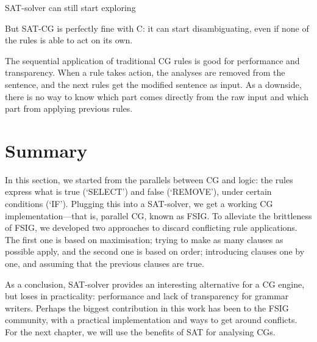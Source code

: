 SAT-solver can still start exploring

But SAT-CG is perfectly fine with C: it can start disambiguating, even if none of the rules is able to act on its own. 




The sequential application of traditional CG rules is good for
performance and transparency. When a rule takes action, the analyses
are removed from the sentence, and the next rules get the modified
sentence as input. 
As a downside, there is no way to know which part comes directly from the
raw input and which part from applying previous rules.





\section{Summary}

In this section, we started from the parallels between CG and logic:
the rules express what is true (`SELECT') and false (`REMOVE'), under certain conditions (`IF').
Plugging this into a SAT-solver, we get a working CG implementation---that is, parallel CG, known as FSIG. 
To alleviate the brittleness of FSIG, we developed two approaches to discard conflicting rule applications.
The first one is based on maximisation; trying to make as many clauses as possible apply, and the second one is based on order; introducing clauses one by one, and assuming that the previous clauses are true.


As a conclusion, SAT-solver provides an interesting alternative for a CG engine, but loses in practicality: performance and lack of transparency for grammar writers.
Perhaps the biggest contribution in this work has been to the FSIG community, with a practical implementation and ways to get around conflicts.
For the next chapter, we will use the benefits of SAT for analysing CGs.







